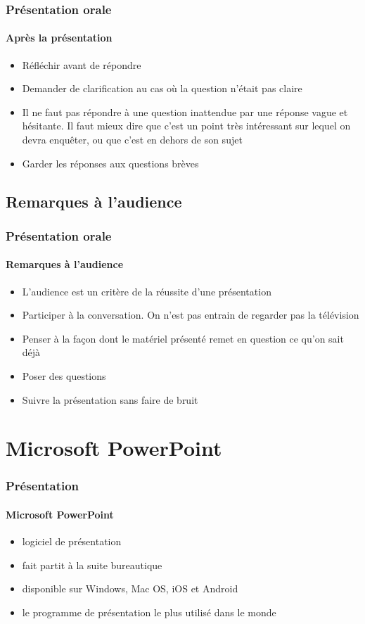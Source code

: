 \documentclass[xcolor=table, usenames,dvipsnames]{beamer}
\begin{document}
\begin{frame}
\frametitle{Présentation orale}
\framesubtitle{Après la présentation}

\begin{itemize}
	\item Réfléchir avant de répondre
	\item Demander de clarification au cas où la question n'était pas claire 
	\item Il ne faut pas répondre à une question inattendue par une réponse vague et hésitante.
	Il faut mieux dire que c'est un point très intéressant sur lequel on devra enquêter, ou que c'est en dehors de son sujet 
	\item Garder les réponses aux questions brèves
\end{itemize}

\end{frame}

\subsection{Remarques à l'audience}

\begin{frame}
\frametitle{Présentation orale}
\framesubtitle{Remarques à l'audience}

\begin{itemize}
	\item L'audience est un critère de la réussite d'une présentation
	\item Participer à la conversation. On n'est pas entrain de regarder pas la télévision
	\item Penser à la façon dont le matériel présenté remet en question ce qu'on sait déjà
	\item Poser des questions
	\item Suivre la présentation sans faire de bruit
\end{itemize}

\end{frame}

\section{Microsoft PowerPoint}

\begin{frame}
\frametitle{Présentation}
\framesubtitle{Microsoft PowerPoint}
\begin{itemize}
	\item logiciel de présentation
	\item fait partit à la suite bureautique 
	\item disponible sur Windows, Mac OS, iOS et Android
	\item le programme de présentation le plus utilisé dans le monde
\end{itemize}
\end{frame}
\end{document}
